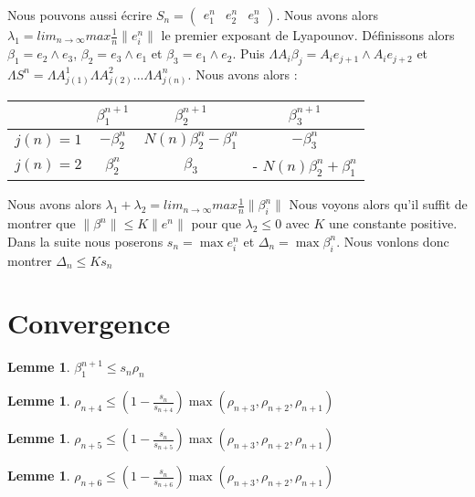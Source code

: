 \documentclass[12pt]{article}
\theoremstyle{plain}%
\newtheorem{lem}[thm]{Lemme}
\theoremstyle{definition}
\theoremstyle{remark}
\begin{document}
Nous pouvons aussi écrire $S_n=\begin{pmatrix} e_1^n & e_2^n & e_3^n\end{pmatrix}$.
 Nous avons alors $\lambda_1= lim_{n\to \infty} max \frac{1}{n}\|e_i^n\|$ le premier exposant de Lyapounov.\newline
 Définissons alors $\beta_1=e_2 \land e_3$, $\beta_2=e_3 \land e_1$ et $\beta_3=e_1 \land e_2$.
 Puis $\Lambda A_i \beta_j=A_i e_{j+1} \land A_i e_{j+2}$ et $\Lambda S^n=\Lambda A_{j(1)}^1  \Lambda A_{j(2)}^2 ... \Lambda A_{j(n)}^n$. \newline
 Nous avons alors :
  \begin{tabular}{c|c|c|c|}
    & $\beta_1^{n+1}$ & $\beta_2^{n+1}$ & $\beta_3^{n+1}$\\
  \hline
  $j(n)=1$ & $-\beta_2^{n}$ & $N(n) \beta_2^n-\beta_1^n$ & $-\beta_3^n$ \\
  $j(n)=2$ & $\beta_2^{n}$ & $\beta_3$ & - $N(n) \beta_2^n+\beta_1^n$ \\
  \end{tabular}
  Nous avons alors $\lambda_1 + \lambda_2= lim_{n\to \infty} max \frac{1}{n}\|\beta_i^n\|$ \newline
  Nous voyons alors qu'il suffit de montrer que $\|\beta^n\| \leq K \|e^n\|$ pour que $\lambda_2 \leq 0$ avec $K$ une constante positive. \newline
  Dans la suite nous poserons $s_n= \max e_i^n$ et $\Delta_n=\max \beta_i^n$. Nous vonlons donc montrer $\Delta_n \leq K s_n$
\section{Convergence}
\begin{lem}
$\beta_1^{n+1} \leq s_n \rho_n$
\end{lem}
\begin{lem}
$\rho_{n+4} \leq (1-\frac{s_n}{s_{n+4}})\max{(\rho_{n+3},\rho_{n+2},\rho_{n+1})}$
\end{lem}
\begin{lem}
$\rho_{n+5} \leq (1-\frac{s_n}{s_{n+5}})\max{(\rho_{n+3},\rho_{n+2},\rho_{n+1})}$
\end{lem}
\begin{lem}
$\rho_{n+6} \leq (1-\frac{s_n}{s_{n+6}})\max{(\rho_{n+3},\rho_{n+2},\rho_{n+1})}$
\end{lem}
\end{document}
